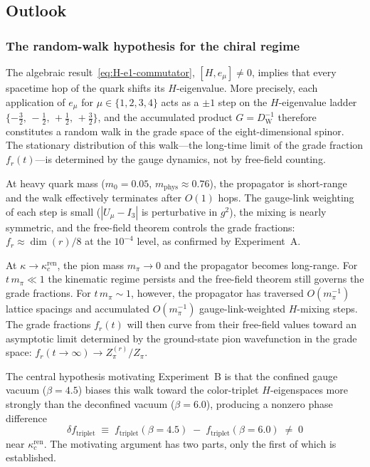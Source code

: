\documentclass[12pt]{article}
\theoremstyle{definition}
\theoremstyle{remark}
\newcommand{\dW}{D_{\mathrm{W}}}        %
\newcommand{\kcren}{\kappa_{c}^{\mathrm{ren}}}      %
\newcommand{\ftriplet}{f_{\mathrm{triplet}}}          %
\newcommand{\dftriplet}{\delta f_{\mathrm{triplet}}}  %
\begin{document}
	
	
	\subsection{Outlook}
	\label{sec:outlook}
	
	\subsubsection{The random-walk hypothesis for the chiral regime}
	\label{sec:random-walk-hypothesis}
	
	The algebraic result~\eqref{eq:H-e1-commutator}, $[H,e_\mu]\neq0$, implies
	that every spacetime hop of the quark shifts its $H$-eigenvalue.  More
	precisely, each application of $e_\mu$ for $\mu\in\{1,2,3,4\}$ acts as a
	$\pm1$ step on the $H$-eigenvalue ladder
	$\{-\tfrac{3}{2},\,-\tfrac{1}{2},\,+\tfrac{1}{2},\,+\tfrac{3}{2}\}$, and
	the accumulated product $G=\dW^{-1}$ therefore constitutes a random walk in
	the grade space of the eight-dimensional spinor.  The stationary distribution
	of this walk---the long-time limit of the grade fraction $f_r(t)$---is
	determined by the gauge dynamics, not by free-field counting.
	
	At heavy quark mass ($m_0=0.05$, $m_{\mathrm{phys}}\approx0.76$), the
	propagator is short-range and the walk effectively terminates after $O(1)$
	hops.  The gauge-link weighting of each step is small ($|U_\mu-I_3|$ is
	perturbative in $g^2$), the mixing is nearly symmetric, and the free-field
	theorem controls the grade fractions: $f_r\approx\dim(r)/8$ at the $10^{-4}$
	level, as confirmed by Experiment~A.
	
	At $\kappa\to\kcren$, the pion mass $m_\pi\to0$ and the propagator becomes
	long-range.  For $t\,m_\pi\ll1$ the kinematic regime persists and the
	free-field theorem still governs the grade fractions.  For $t\,m_\pi\sim1$,
	however, the propagator has traversed $O(m_\pi^{-1})$ lattice spacings and
	accumulated $O(m_\pi^{-1})$ gauge-link-weighted $H$-mixing steps.  The grade
	fractions $f_r(t)$ will then curve from their free-field values toward an
	asymptotic limit determined by the ground-state pion wavefunction in the grade
	space: $f_r(t\to\infty)\to Z_\pi^{(r)}/Z_\pi$.
	
	The central hypothesis motivating Experiment~B is that the confined gauge
	vacuum ($\beta=4.5$) biases this walk toward the color-triplet $H$-eigenspaces
	more strongly than the deconfined vacuum ($\beta=6.0$), producing a nonzero
	phase difference
	\begin{equation}
		\dftriplet \;\equiv\;
		\ftriplet(\beta=4.5) \;-\; \ftriplet(\beta=6.0) \;\neq\; 0
		\label{eq:delta-f-triplet}
	\end{equation}
	near $\kcren$.  The motivating argument has two parts, only the first of
	which is established.
	
\end{document}
